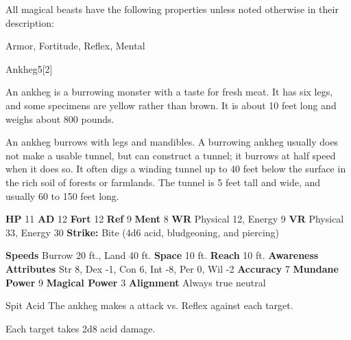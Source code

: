         All magical beasts have the following properties unless noted otherwise in their description:
        
    
     Armor,
     Fortitude,
     Reflex,
     Mental
  
  
      
  \begin{monsection}{Ankheg}{5}[2]
    \vspace{-1em}\vspace{-1em}
    \vspace{0em}

    
      An ankheg is a burrowing monster with a taste for fresh meat. It has six legs, and some specimens are yellow rather than brown. It is about 10 feet long and weighs about 800 pounds.

      An ankheg burrows with legs and mandibles. A burrowing ankheg usually does not make a usable tunnel, but can construct a tunnel; it burrows at half speed when it does so. It often digs a winding tunnel up to 40 feet below the surface in the rich soil of forests or farmlands. The tunnel is 5 feet tall and wide, and usually 60 to 150 feet long.
    
    

    \begin{spellcontent}
      \begin{spelltargetinginfo}
        \pari \textbf{HP} 11 \monsep
          \textbf{AD} 12 \monsep
          \textbf{Fort} 12 \monsep
          \textbf{Ref} 9 \monsep
          \textbf{Ment} 8
        \pari \textbf{WR} Physical 12, Energy 9 \monsep
        \textbf{VR} Physical 33, Energy 30
        \pari \textbf{Strike:}
            Bite  (4d6 acid, bludgeoning, and piercing)
      \end{spelltargetinginfo}
    \end{spellcontent}
    \begin{monsterfooter}
      \pari \textbf{Speeds} Burrow 20 ft., Land 40 ft. \monsep
        \textbf{Space} 10 ft. \monsep
        \textbf{Reach} 10 ft.
      \pari \textbf{Awareness} 
      \pari \textbf{Attributes}
        Str 8, Dex -1,
        Con 6, Int -8,
        Per 0, Wil -2
      \pari \textbf{Accuracy} 7 \monsep
        \textbf{Mundane Power} 9 \monsep
      \textbf{Magical Power} 3
      \pari \textbf{Alignment} Always true neutral
    \end{monsterfooter}
  \end{monsection}
  \begin{freeability}{Spit Acid}
       The ankheg makes a  attack
        vs. Reflex against each target.
    
    \hit Each target takes 2d8 acid damage.
    \end{freeability}
  

